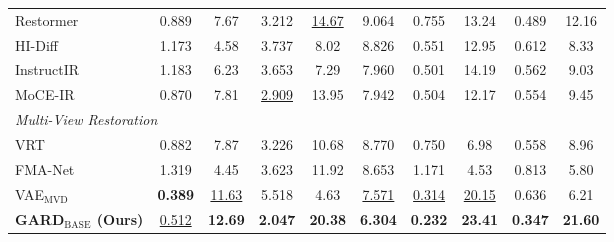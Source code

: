 \begin{table}[h]
{\begin{tabular}{lccccccccc}
Restormer~\cite{zamir2022restormer}
&   0.889    &       7.67
&   3.212    &       \underline{14.67}
&   9.064
&   0.755   &       13.24
&   0.489   &       12.16
\\



HI-Diff~\cite{chen2023hierarchical}
&   1.173    &       4.58
&   3.737     &      8.02
&   8.826
&   0.551   &       12.95
&   0.612    &      8.33
\\


InstructIR~\cite{conde2024high}
&  1.183     &     6.23
&  3.653    &      7.29
&  7.960
&  0.501     &     14.19
&  0.562    &      9.03
\\

MoCE-IR~\cite{zamfir2024complexityexperts}
&   0.870   &      7.81
&   \underline{2.909}    &     13.95
&   7.942   
&   0.504    &     12.17
&   0.554   &      9.45 
\\


\midrule

\multicolumn{10}{l}{\textit{Multi-View Restoration}} \\
\midrule

VRT~\cite{liang2024vrt}
&    0.882   &     7.87  
&    3.226   &     10.68 
&    8.770  
&    0.750   &     6.98
&    0.558   &     8.96  
\\


FMA-Net~\cite{Youk_2024_CVPR}
&   1.319    &   4.45
&   3.623    &   11.92
&   8.653    
&   1.171    &   4.53
&   0.813    &   5.80
\\


VAE$_\text{MVD}$
&   \textbf{0.389}    &     \underline{11.63}
&   5.518    &     4.63
&   \underline{7.571}
&   \underline{0.314}    &    \underline{20.15}
&   0.636    &    6.21
\\



\textbf{GARD$_\text{BASE}$ (Ours)}
&  \underline{0.512}    &    \textbf{12.69}
&  \textbf{2.047}   &     \textbf{20.38}  
&  \textbf{6.304}
&  \textbf{0.232}     &     \textbf{23.41}
&  \textbf{0.347}     &     \textbf{21.60}  
\\


\bottomrule
\end{tabular}
}

\end{table}